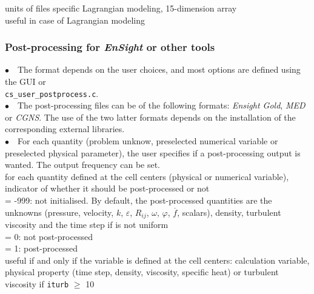 {units of files specific Lagrangian modeling, 15-dimension array\\
useful in case of Lagrangian modeling}


\subsubsection{Post-processing for {\em EnSight} or other tools}

$\bullet\quad$The format depends on the user choices, and most options
are defined using the GUI or \\
\texttt{cs\_user\_postprocess.c}.\\
$\bullet\quad$The post-processing files can be of the following formats: {\em Ensight Gold},
{\em MED} or {\em CGNS}. The use of the two latter formats depends on
the installation of the corresponding external libraries.\\
$\bullet\quad$For each quantity (problem unknow, preselected numerical
variable or preselected physical parameter), the user specifies if a
post-processing output is wanted. The output frequency can be set.\\

{for each quantity defined at the cell centers (physical or numerical
variable), indicator of whether it should be post-processed or not \\
\hspace*{1.3cm}= -999: not initialised. By default, the post-processed
quantities are the unknowns (pressure, velocity, $k$, $\varepsilon$,
$R_{ij}$, $\omega$, $\varphi$, $\overline{f}$, scalars), density,
turbulent viscosity and the time step if is not uniform\\
\hspace*{1.3cm}= 0: not post-processed\\
\hspace*{1.3cm}= 1: post-processed\\
useful if and only if the variable is defined at the cell centers:
calculation variable, physical property (time step, density,
viscosity, specific heat) or turbulent viscosity if {\tt iturb}
$\geqslant$ 10}

